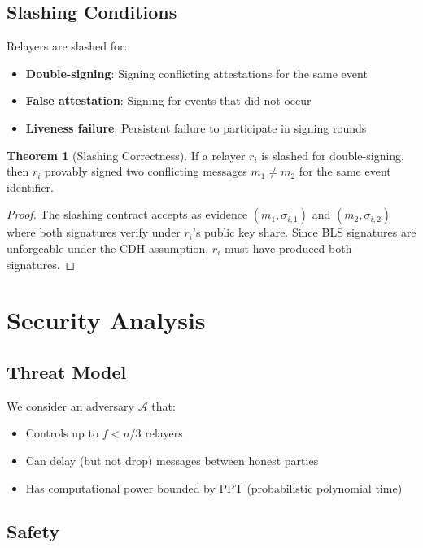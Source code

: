 \documentclass[11pt,a4paper]{article}
\theoremstyle{definition}
\newtheorem{theorem}{Theorem}
\begin{document}
\subsection{Slashing Conditions}

Relayers are slashed for:

\begin{itemize}
    \item \textbf{Double-signing}: Signing conflicting attestations for the same event
    \item \textbf{False attestation}: Signing for events that did not occur
    \item \textbf{Liveness failure}: Persistent failure to participate in signing rounds
\end{itemize}

\begin{theorem}[Slashing Correctness]
If a relayer $r_i$ is slashed for double-signing, then $r_i$ provably signed two conflicting messages $m_1 \neq m_2$ for the same event identifier.
\end{theorem}

\begin{proof}
The slashing contract accepts as evidence $(m_1, \sigma_{i,1})$ and $(m_2, \sigma_{i,2})$ where both signatures verify under $r_i$'s public key share. Since BLS signatures are unforgeable under the CDH assumption, $r_i$ must have produced both signatures.
\end{proof}

\section{Security Analysis}

\subsection{Threat Model}

We consider an adversary $\mathcal{A}$ that:
\begin{itemize}
    \item Controls up to $f < n/3$ relayers
    \item Can delay (but not drop) messages between honest parties
    \item Has computational power bounded by PPT (probabilistic polynomial time)
\end{itemize}

\subsection{Safety}
\end{document}
